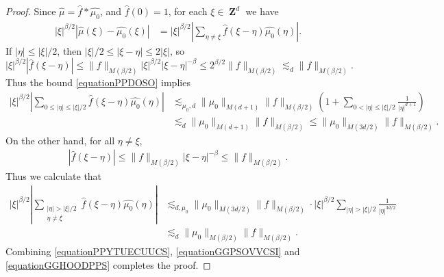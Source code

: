 \documentclass[12pt,reqno]{article}
\numberwithin{equation}{section}
\DeclareMathOperator{\ZZ}{\mathbf{Z}}
\numberwithin{theorem}{section}
\begin{document}
\begin{proof}
    Since $\widehat{\mu} = \widehat{f} * \widehat{\mu_0}$, and $\widehat{f}(0) = 1$, for each $\xi \in \ZZ^d$ we have
    \begin{equation} \label{equationPPYTUECUUCS}
    \begin{split}
        |\xi|^{\beta/2} |\widehat{\mu}(\xi) - \widehat{\mu_0}(\xi)| &= |\xi|^{\beta/2} \left| \sum_{\eta \neq \xi} \widehat{f}(\xi - \eta) \widehat{\mu_0}(\eta) \right|.
    \end{split}
    \end{equation}
    If $|\eta| \leq |\xi|/2$, then $|\xi|/2 \leq |\xi - \eta| \leq 2 |\xi|$, so
    \begin{equation} \label{equationPPDOSO}
        |\xi|^{\beta/2} |\widehat{f}(\xi - \eta)| \leq \| f \|_{M(\beta/2)} |\xi|^{\beta/2} |\xi-\eta|^{-\beta} \leq 2^{\beta/2} \| f \|_{M(\beta/2)} \lesssim_d \| f \|_{M(\beta/2)}.
    \end{equation}
    Thus the bound \eqref{equationPPDOSO} implies
    \begin{equation} \label{equationGGPSOVVCSI}
    \begin{split}
        |\xi|^{\beta/2} \left| \sum_{0 \leq |\eta| \leq |\xi|/2} \widehat{f}(\xi - \eta) \widehat{\mu_0}(\eta) \right| &\lesssim_{\mu_0,d} \| \mu_0 \|_{M(d+1)} \| f \|_{M(\beta/2)} \left( 1 + \sum_{0 < |\eta| \leq |\xi|/2} \frac{1}{|\eta|^{d+1}} \right)\\
        &\lesssim_d \| \mu_0 \|_{M(d+1)} \| f \|_{M(\beta/2)} \leq \| \mu_0 \|_{M(3d/2)} \| f \|_{M(\beta/2)}.
    \end{split}
    \end{equation}
    On the other hand, for all $\eta \neq \xi$,
    \begin{equation} \label{equationGGDPSOX}
    \begin{split}
        |\widehat{f}(\xi - \eta)| \leq  \| f \|_{M(\beta/2)} |\xi - \eta|^{-\beta} \leq \| f \|_{M(\beta/2)}.
    \end{split}
    \end{equation}
    Thus we calculate that
    \begin{equation} \label{equationGGHOODPPS}
    \begin{split}
        |\xi|^{\beta/2} \left| \sum_{\substack{|\eta| > |\xi|/2\\ \eta \neq \xi}} \widehat{f}(\xi - \eta) \widehat{\mu_0}(\eta) \right| &\lesssim_{d,\mu_0} \| \mu_0 \|_{M(3d/2)} \| f \|_{M(\beta/2)} \cdot |\xi|^{\beta/2} \sum_{|\eta| > |\xi|/2} \frac{1}{|\eta|^{3d/2}}\\
        &\lesssim_d \| \mu_0 \|_{M(\beta/2)} \| f \|_{M(\beta/2)}.
    \end{split}
    \end{equation}
    Combining \eqref{equationPPYTUECUUCS}, \eqref{equationGGPSOVVCSI} and \eqref{equationGGHOODPPS} completes the proof.
\end{proof}
\end{document}
